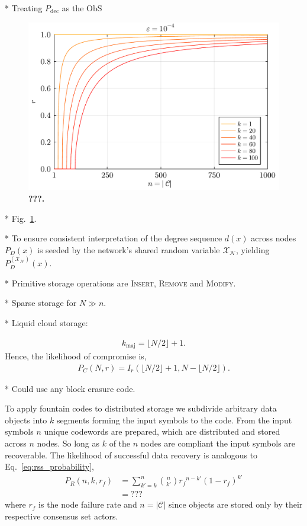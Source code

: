 * Treating $P_\mathrm{dec}$ as the ObS 

\begin{figure}[!htb]
	\includegraphics[width=\columnwidth]{figs/DCNFS.pdf}
	\caption{\textbf{???.}} \label{fig:DCNFS}
\end{figure}

* Fig.~\ref{fig:DCNFS}.

* To ensure consistent interpretation of the degree sequence $d(x)$ across nodes $P_D(x)$ is seeded by the network's shared random variable $\mathcal{X}_\mathcal{N}$, yielding $P_D^{(\mathcal{X}_\mathcal{N})}(x)$.

* Primitive storage operations are \textsc{Insert}, \textsc{Remove} and \textsc{Modify}.

* Sparse storage for $N\gg n$.

* Liquid cloud storage: \cite{LiquidCloudStorage}

\begin{align}
	k_\mathrm{maj} = \lfloor N/2 \rfloor + 1.
\end{align}
Hence, the likelihood of compromise is,
\begin{align}
	P_C(N,r) = I_r(\lfloor N/2 \rfloor + 1,N-\lfloor N/2 \rfloor).
\end{align}

* Could use any block erasure code.

To apply fountain codes to distributed storage we subdivide arbitrary data objects into $k$ segments forming the input symbols to the code. From the input symbols $n$ unique codewords are prepared, which are distributed and stored across $n$ nodes. So long as $k$ of the $n$ nodes are compliant the input symbols are recoverable. The likelihood of successful data recovery is analogous to Eq.~\eqref{eq:rss_probability},
\begin{align}
	P_R(n,k,r_f) & = \sum_{k'=k}^{n} \binom{n}{k'} {r_f}^{n-k'} (1-r_f)^{k'} \nonumber \\
	         & = ???%
\end{align}
where $r_f$ is the node failure rate and \mbox{$n=|\mathcal{C}|$} since objects are stored only by their respective consensus set actors.

